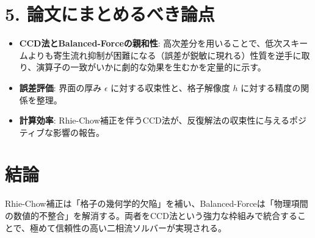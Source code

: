 \documentclass[12pt, a4paper, titlepage]{article}
\begin{document}
\section*{5. 論文にまとめるべき論点}
\begin{itemize}
    \item \textbf{CCD法とBalanced-Forceの親和性}: 高次差分を用いることで、低次スキームよりも寄生流れ抑制が困難になる（誤差が鋭敏に現れる）性質を逆手に取り、演算子の一致がいかに劇的な効果を生むかを定量的に示す。
    \item \textbf{誤差評価}: 界面の厚み $\epsilon$ に対する収束性と、格子解像度 $h$ に対する精度の関係を整理。
    \item \textbf{計算効率}: Rhie-Chow補正を伴うCCD法が、反復解法の収束性に与えるポジティブな影響の報告。
\end{itemize}

\section*{結論}
Rhie-Chow補正は「格子の幾何学的欠陥」を補い、Balanced-Forceは「物理項間の数値的不整合」を解消する。両者をCCD法という強力な枠組みで統合することで、極めて信頼性の高い二相流ソルバーが実現される。
\end{document}
